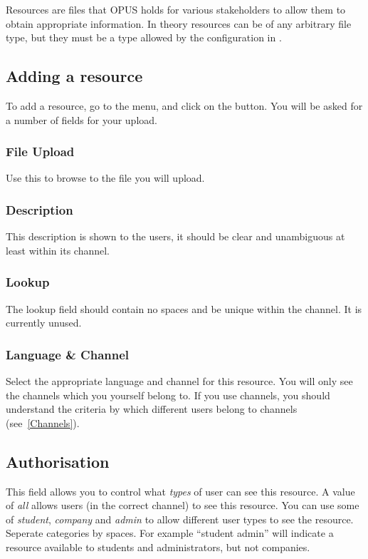 \documentclass[12 pt]{book}
\begin{document}
Resources are files that OPUS holds for various stakeholders to allow
them to obtain appropriate information. In theory resources can be of
any arbitrary file type, but they must be a type allowed by the 
configuration in .

\subsection{Adding a resource}

To add a resource, go to the 
menu, and click on the  button. You will be asked for a
number of fields for your upload.

\subsubsection{File Upload}

Use this to browse to the file you will upload.

\subsubsection{Description}

This description is shown to the users, it should be clear and unambiguous at least within its channel.

\subsubsection{Lookup}

The lookup field should contain no spaces and be unique within the channel. It is currently unused.

\subsubsection{Language \& Channel}

Select the appropriate language and channel for this resource. You will only see the channels which you yourself belong to.
If you use channels, you should understand the criteria by which
different users belong to channels (see~\ref{Channels}).

\subsection{Authorisation}

This field allows you to control what \emph{types} of user can see this resource.
A value of \emph{all} allows users (in the correct channel) to see this resource.
You can use some of \emph{student}, \emph{company} and \emph{admin} to allow different
user types to see the resource. Seperate categories by spaces. For example
``student admin'' will indicate a resource available to students and
administrators, but not companies.
\end{document}
